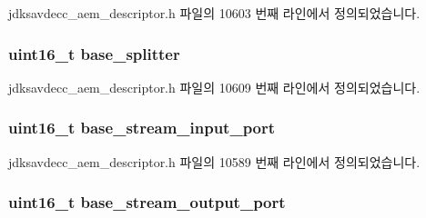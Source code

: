 jdksavdecc\+\_\+aem\+\_\+descriptor.\+h 파일의 10603 번째 라인에서 정의되었습니다.

\subsubsection[{\texorpdfstring{base\+\_\+splitter}{base_splitter}}]{\setlength{\rightskip}{0pt plus 5cm}uint16\+\_\+t base\+\_\+splitter}\hypertarget{structjdksavdecc__descriptor__sensor__unit_a7a10a93a209406b90273d791f69a4421}{}\label{structjdksavdecc__descriptor__sensor__unit_a7a10a93a209406b90273d791f69a4421}


jdksavdecc\+\_\+aem\+\_\+descriptor.\+h 파일의 10609 번째 라인에서 정의되었습니다.

\subsubsection[{\texorpdfstring{base\+\_\+stream\+\_\+input\+\_\+port}{base_stream_input_port}}]{\setlength{\rightskip}{0pt plus 5cm}uint16\+\_\+t base\+\_\+stream\+\_\+input\+\_\+port}\hypertarget{structjdksavdecc__descriptor__sensor__unit_a8ad4ba35aee3ad22d5e946438bbaba53}{}\label{structjdksavdecc__descriptor__sensor__unit_a8ad4ba35aee3ad22d5e946438bbaba53}


jdksavdecc\+\_\+aem\+\_\+descriptor.\+h 파일의 10589 번째 라인에서 정의되었습니다.

\subsubsection[{\texorpdfstring{base\+\_\+stream\+\_\+output\+\_\+port}{base_stream_output_port}}]{\setlength{\rightskip}{0pt plus 5cm}uint16\+\_\+t base\+\_\+stream\+\_\+output\+\_\+port}\hypertarget{structjdksavdecc__descriptor__sensor__unit_a234b990d7bb2f22da0ba4bebadc71a70}{}\label{structjdksavdecc__descriptor__sensor__unit_a234b990d7bb2f22da0ba4bebadc71a70}


